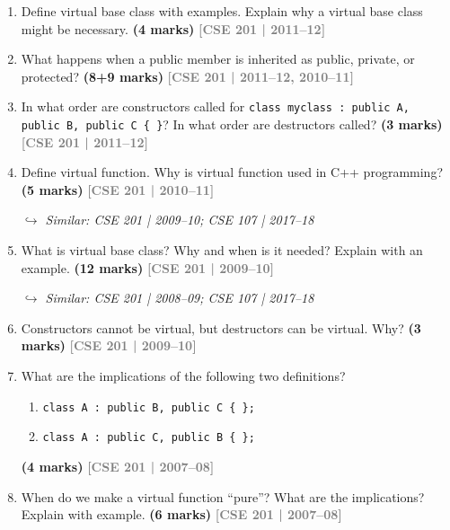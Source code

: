 \documentclass[12pt,a3paper]{article}
\newcommand{\yr}[1]{\hfill\textcolor{gray}{\small\textbf{[#1]}}}
\newcommand{\mk}[1]{\textcolor{orange!70!black}{\small\textbf{(#1 marks)}}}
\newcommand{\variant}[1]{\par\vspace{1pt}\textcolor{blue!50!black}%
  {\footnotesize\textit{$\hookrightarrow$ Similar: #1}}}
\begin{document}
\begin{enumerate}



\item Define virtual base class with examples. Explain why a virtual base class might be necessary. \mk{4}
\yr{CSE 201 | 2011--12}

\item What happens when a public member is inherited as public, private, or protected? \mk{8+9}
\yr{CSE 201 | 2011--12, 2010--11}






\item In what order are constructors called for \texttt{class myclass : public A, public B, public C \{ \}}? In what order are destructors called? \mk{3}
\yr{CSE 201 | 2011--12}




\item Define virtual function. Why is virtual function used in C++ programming? \mk{5}
\yr{CSE 201 | 2010--11}
\variant{CSE 201 | 2009--10; CSE 107 | 2017--18}





\item What is virtual base class? Why and when is it needed? Explain with an example. \mk{12}
\yr{CSE 201 | 2009--10}
\variant{CSE 201 | 2008--09; CSE 107 | 2017--18}

\item Constructors cannot be virtual, but destructors can be virtual. Why? \mk{3}
\yr{CSE 201 | 2009--10}




\item What are the implications of the following two definitions?
\begin{enumerate}
  \item \texttt{class A : public B, public C \{ \};}
  \item \texttt{class A : public C, public B \{ \};}
\end{enumerate}
\mk{4}
\yr{CSE 201 | 2007--08}




\item When do we make a virtual function ``pure''? What are the implications? Explain with example. \mk{6}
\yr{CSE 201 | 2007--08}







\end{enumerate}
\end{document}
